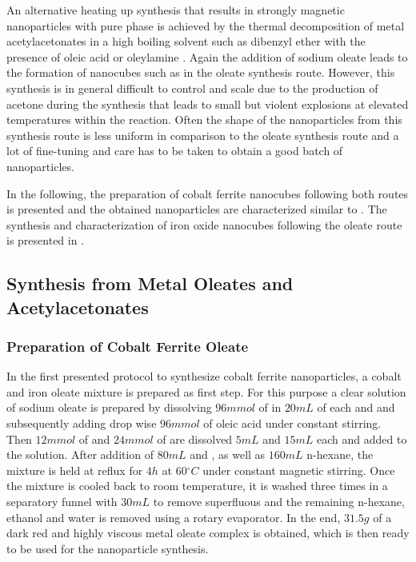 \documentclass[\main/dresen_thesis.tex]{subfiles}
\begin{document}
  An alternative heating up synthesis that results in strongly magnetic nanoparticles with pure phase is achieved by the thermal decomposition of metal acetylacetonates in a high boiling solvent such as dibenzyl ether with the presence of oleic acid or oleylamine \cite{Sun_2002_SizeC, Wu_2014_Monol}.
  Again the addition of sodium oleate leads to the formation of nanocubes such as in the oleate synthesis route.
  However, this synthesis is in general difficult to control and scale due to the production of acetone during the synthesis that leads to small but violent explosions at elevated temperatures within the reaction.
  Often the shape of the nanoparticles from this synthesis route is less uniform in comparison to the oleate synthesis route and a lot of fine-tuning and care has to be taken to obtain a good batch of nanoparticles.

  In the following, the preparation of cobalt ferrite nanocubes following both routes is presented and the obtained nanoparticles are characterized similar to .
  The synthesis and characterization of iron oxide nanocubes following the oleate route is presented in .

  \subsection{Synthesis from Metal Oleates and Acetylacetonates}
    \subsubsection{Preparation of Cobalt Ferrite Oleate}
      In the first presented protocol to synthesize cobalt ferrite nanoparticles, a cobalt and iron oleate mixture is prepared as first step.
      For this purpose a clear solution of sodium oleate is prepared by dissolving $96 \unit{mmol}$ of  in $20 \unit{mL}$ of each  and  and subsequently adding drop wise $96 \unit{mmol}$ of oleic acid under constant stirring.
      Then $12 \unit{mmol}$ of  and $24 \unit{mmol}$ of  are dissolved $5 \unit{mL}$  and $15 \unit{mL}$  each and added to the solution.
      After addition of $80 \unit{mL}$  and , as well as $160 \unit{mL}$ n-hexane, the mixture is held at reflux for $4 \unit{h}$ at $60 \unit{^\circ C}$ under constant magnetic stirring.
      Once the mixture is cooled back to room temperature, it is washed three times in a separatory funnel with $30 \unit{mL}$  to remove superfluous  and the remaining n-hexane, ethanol and water is removed using a rotary evaporator.
      In the end, $31.5 \unit{g}$ of a dark red and highly viscous metal oleate complex is obtained, which is then ready to be used for the nanoparticle synthesis.
\end{document}
